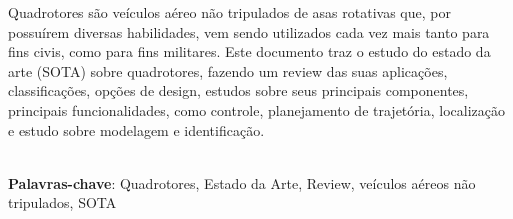 \begin{thesisresumo}

Quadrotores são veículos aéreo não tripulados de asas rotativas que, por possuírem diversas habilidades, vem sendo utilizados cada vez mais tanto para fins civis, como para fins militares. Este documento traz o estudo do estado da arte (SOTA) sobre quadrotores, fazendo um review das suas aplicações, classificações, opções de design, estudos sobre seus principais componentes, principais funcionalidades, como controle, planejamento de trajetória, localização e estudo sobre modelagem e identificação.

\ \\


\textbf{Palavras-chave}: Quadrotores, Estado da Arte, Review, veículos aéreos não tripulados, SOTA

\end{thesisresumo}
